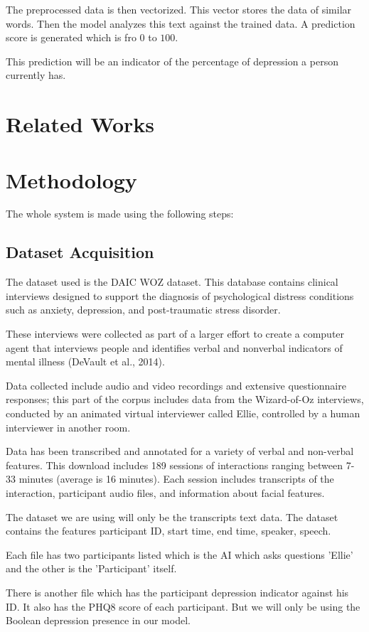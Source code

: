\documentclass[runningheads]{llncs}
\begin{document}
The preprocessed data is then vectorized. This vector stores the data of similar words. Then the model analyzes this text against the trained data. A prediction score is generated which is fro $0$ to $100$.

This prediction will be an indicator of the percentage of depression a person currently has.
\section{Related Works}
 
\section{Methodology}
The whole system is made using the following steps: 

\subsection{Dataset Acquisition}
The dataset used is the DAIC WOZ dataset. This database contains clinical interviews designed to support the diagnosis of psychological distress conditions such as anxiety, depression, and post-traumatic stress disorder.

These interviews were collected as part of a larger effort to create a computer agent that interviews people and identifies verbal and nonverbal indicators of mental illness (DeVault et al., 2014). 

Data collected include audio and video recordings and extensive questionnaire responses; this part of the corpus includes data from the Wizard-of-Oz interviews, conducted by an animated virtual interviewer called Ellie, controlled by a human interviewer in another room.

Data has been transcribed and annotated for a variety of verbal and non-verbal features. This download includes 189 sessions of interactions ranging between 7-33 minutes (average is 16 minutes). Each session includes transcripts of the interaction, participant audio files, and information about facial features.

The dataset we are using will only be the transcripts text data. The dataset contains the features participant ID, start time, end time, speaker, speech.

Each file has two participants listed which is the AI which asks questions 'Ellie' and the other is the 'Participant' itself.

There is another file which has the participant depression indicator against his ID. It also has the PHQ8 score of each participant. But we will only be using the Boolean depression presence in our model.
\end{document}
